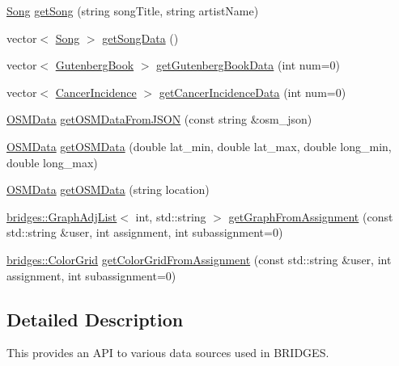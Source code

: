 \begin{DoxyCompactItemize}
\item 
\mbox{\hyperlink{classbridges_1_1_song}{Song}} \mbox{\hyperlink{classbridges_1_1_data_source_a284c9d572415b67df6989ab8ab97d0e2}{get\+Song}} (string song\+Title, string artist\+Name)
\item 
vector$<$ \mbox{\hyperlink{classbridges_1_1_song}{Song}} $>$ \mbox{\hyperlink{classbridges_1_1_data_source_a5e8d035a1becf96c71569e0966e93849}{get\+Song\+Data}} ()
\item 
vector$<$ \mbox{\hyperlink{classbridges_1_1_gutenberg_book}{Gutenberg\+Book}} $>$ \mbox{\hyperlink{classbridges_1_1_data_source_a1057509d6adf4cbfd881854adb274304}{get\+Gutenberg\+Book\+Data}} (int num=0)
\item 
vector$<$ \mbox{\hyperlink{classbridges_1_1_cancer_incidence}{Cancer\+Incidence}} $>$ \mbox{\hyperlink{classbridges_1_1_data_source_a52d8161e7c093ab3615acea7085f6689}{get\+Cancer\+Incidence\+Data}} (int num=0)
\item 
\mbox{\hyperlink{classbridges_1_1_o_s_m_data}{O\+S\+M\+Data}} \mbox{\hyperlink{classbridges_1_1_data_source_a1b483de1cce9921b70116213382cdaf0}{get\+O\+S\+M\+Data\+From\+J\+S\+ON}} (const string \&osm\+\_\+json)
\item 
\mbox{\hyperlink{classbridges_1_1_o_s_m_data}{O\+S\+M\+Data}} \mbox{\hyperlink{classbridges_1_1_data_source_a185c723a4f6d25812f9d64323775faaa}{get\+O\+S\+M\+Data}} (double lat\+\_\+min, double lat\+\_\+max, double long\+\_\+min, double long\+\_\+max)
\item 
\mbox{\hyperlink{classbridges_1_1_o_s_m_data}{O\+S\+M\+Data}} \mbox{\hyperlink{classbridges_1_1_data_source_ac525a267494ac612616b924db29529d9}{get\+O\+S\+M\+Data}} (string location)
\item 
\mbox{\hyperlink{classbridges_1_1_graph_adj_list}{bridges\+::\+Graph\+Adj\+List}}$<$ int, std\+::string $>$ \mbox{\hyperlink{classbridges_1_1_data_source_ac4edf55c163c60f17b13f5499e5d2e65}{get\+Graph\+From\+Assignment}} (const std\+::string \&user, int assignment, int subassignment=0)
\item 
\mbox{\hyperlink{classbridges_1_1_color_grid}{bridges\+::\+Color\+Grid}} \mbox{\hyperlink{classbridges_1_1_data_source_aa65136879011e1ec237380ef8587fea2}{get\+Color\+Grid\+From\+Assignment}} (const std\+::string \&user, int assignment, int subassignment=0)
\end{DoxyCompactItemize}


\subsection{Detailed Description}
This provides an A\+PI to various data sources used in B\+R\+I\+D\+G\+ES. 

